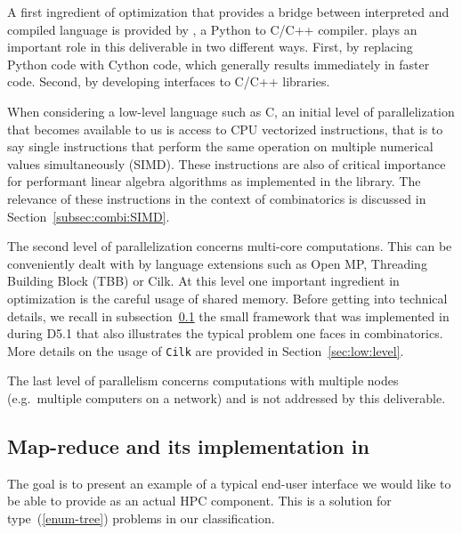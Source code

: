 \documentclass{deliverablereport}
\newcommand{\Cilk}{\texttt{Cilk}\xspace}
\begin{document}
A first ingredient of optimization that provides a bridge between interpreted
and compiled language is provided by \Cython, a Python
to C/C++ compiler. \Cython plays an important role in this deliverable in two
different ways. First, by replacing Python code with Cython code, which generally results
immediately in faster code. Second, by developing interfaces to C/C++ libraries.

When considering a low-level language such as C, an initial level of
parallelization that becomes available to us is access to CPU vectorized
instructions, that is to say single instructions that perform the same operation on multiple
numerical values simultaneously (SIMD). These instructions are also of critical importance for performant
linear algebra algorithms as implemented in the \Linbox library. The relevance of these instructions in the
context of combinatorics is discussed in Section~\ref{subsec:combi:SIMD}.

The second level of parallelization concerns multi-core computations. This can
be conveniently dealt with by language extensions such as Open MP, Threading
Building Block (TBB) or Cilk. At this level one important ingredient in
optimization is the careful usage of shared memory.  Before getting into
technical details, we recall in subsection~\ref{subsec:map-reduce:Sage} the
small framework that was implemented in \Sage during D5.1 that also
illustrates the typical problem one faces in combinatorics.  More details on
the usage of \Cilk are provided in Section~\ref{sec:low:level}.

The last level of parallelism concerns computations with multiple nodes
(e.g.~multiple computers on a network) and is not addressed by this
deliverable.

\subsection{Map-reduce and its implementation in \Sage}
\label{subsec:map-reduce:Sage}

The goal is to present an example of a typical end-user interface
we would like
to be able to provide as an actual HPC component. This is a solution for
type~(\ref{enum-tree}) problems in our classification.
\end{document}
